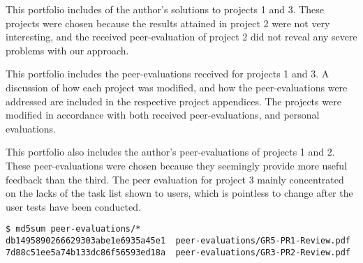 
This portfolio includes of the author's solutions to projects 1 and 3. These
projects were chosen because the results attained in project 2 were not very
interesting, and the received peer-evaluation of project 2 did not reveal any
severe problems with our approach.

This portfolio includes the peer-evaluations received for projects 1 and 3. A
discussion of how each project was modified, and how the peer-evaluations were
addressed are included in the respective project appendices. The projects were
modified in accordance with both received peer-evaluations, and personal
evaluations.

This portfolio also includes the author's peer-evaluations of projects 1 and 2.
These peer-evaluations were chosen because they seemingly provide more useful
feedback than the third. The peer evaluation for project 3 mainly concentrated
on the lacks of the task list shown to users, which is pointless to change
after the user tests have been conducted.

\begin{lstlisting}
$ md5sum peer-evaluations/*
db1495890266629303abe1e6935a45e1  peer-evaluations/GR5-PR1-Review.pdf
7d88c51ee5a74b133dc86f56593ed18a  peer-evaluations/GR3-PR2-Review.pdf
\end{lstlisting}

